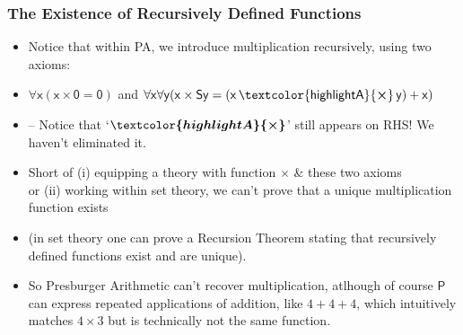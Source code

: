 \begin{frame}
\frametitle{The Existence of Recursively Defined Functions}

\begin{itemize}[<+->]

\item Notice that within PA, we introduce multiplication recursively, using two axioms:
\item[] $\mathsf{\forall x (x \times 0 = 0)}$ and $\mathsf{\forall x \forall y (x \times Sy = (x \, \textcolor{highlightA}{\boldsymbol{\times}} \, y) + x)}$
\item[] -- Notice that `$\boldsymbol{\textcolor{highlightA}{\times}}$' still appears on RHS! We haven't eliminated it. 

\item Short of (i) equipping a theory with function $\times$ \& these two axioms \\ or (ii) working within set theory, we can't prove that a unique multiplication function exists 
\item[] (in set theory one can prove a Recursion Theorem stating that recursively defined functions exist and are unique). 

\item So Presburger Arithmetic can't recover multiplication, atlhough of course $\mathsf{P}$ can express repeated applications of addition, like $4 + 4 + 4$, which intuitively matches $4 \times 3$ but is technically not the same function. 

\end{itemize}
\end{frame}

